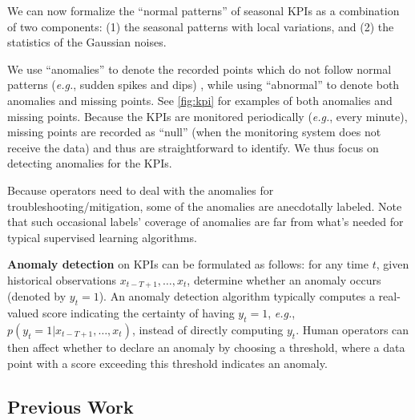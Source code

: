 \documentclass[sigconf]{acmart}
\newcommand\devcomment[1]{\textcolor{red}{***{#1}***}}
\newcommand\devcomment[1]{}
\newcommand\compactvspace[1]{\vspace{#1}}
\newcommand\compactvspace[1]{}
\newcommand{\EG}{\textit{e.g.}}
\begin{document}
We can now formalize the ``normal patterns'' of seasonal KPIs as a combination of two components: (1) the seasonal patterns with local variations, and (2) the statistics of the Gaussian noises.

We use ``anomalies'' to denote the recorded points which do not follow normal patterns (\EG, sudden spikes and dips) , while using ``abnormal'' to denote both anomalies and missing points. See \cref{fig:kpi} for examples of both anomalies and missing points.
 Because the KPIs are monitored periodically (\EG, every minute), missing points are recorded as ``null'' (when the monitoring system does not receive the data) and thus are straightforward to identify.   We thus focus on detecting anomalies for the KPIs.

Because operators need to deal with the anomalies for troubleshooting/mitigation, some of the anomalies are anecdotally labeled. Note that such occasional labels' coverage of anomalies are far from what's needed for typical supervised learning algorithms.


\textbf{Anomaly detection} on KPIs can be formulated as follows: for any time $t$, given historical observations $x_{t-T+1}, \dots, x_t$, determine whether an anomaly occurs (denoted by $y_t=1$).
An anomaly detection algorithm typically computes a real-valued score indicating the certainty of having $y_t=1$, \EG, $p(y_t=1|x_{t-T+1},\dots,x_t)$, instead of directly computing $y_t$.
Human operators can then affect whether to declare an anomaly by choosing a threshold, where a data point with a score exceeding this threshold indicates an anomaly.


\compactvspace{-1em}
\subsection{Previous Work}
\label{sec:previous-work}
\end{document}
